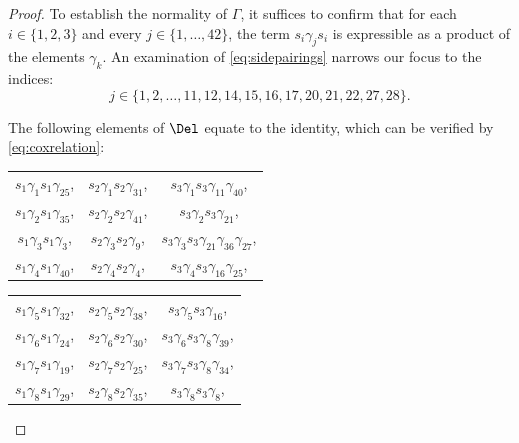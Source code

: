 \begin{proof}
To establish the normality of \(\Gamma\), it suffices to confirm that for each \(i \in \{1,2,3\}\) and every \(j \in \{1,\dots,42\}\), the term \(s_i\gamma_{j} s_i\) is expressible as a product of the elements \(\gamma_k\).
An examination of \eqref{eq:sidepairings} narrows our focus to the indices:
\[
j \in \{1, 2, \dots, 11, 12, 14, 15, 16, 17, 20, 21, 22, 27, 28\}.
\]

The following elements of $\Del$ equate to the identity, which can be verified by \eqref{eq:coxrelation}:
\begin{center}
\begin{tabular}{ccc}
$s_1\gamma_{1}s_1\gamma_{25}$,  &$s_2\gamma_{1}s_2\gamma_{31}$,  &$s_3\gamma_{1}s_3\gamma_{11}\gamma_{40}$, \\
$s_1\gamma_{2}s_1\gamma_{35}$,  &$s_2\gamma_{2}s_2\gamma_{41}$,  &$s_3\gamma_{2}s_3\gamma_{21}$, \\
$s_1\gamma_{3}s_1\gamma_{3}$,  &$s_2\gamma_{3}s_2\gamma_{9}$,  &$s_3\gamma_{3}s_3\gamma_{21}\gamma_{36}\gamma_{27}$, \\
$s_1\gamma_{4}s_1\gamma_{40}$,  &$s_2\gamma_{4}s_2\gamma_{4}$,  &$s_3\gamma_{4}s_3\gamma_{16}\gamma_{25}$, \\
\end{tabular}
\end{center}
\begin{center}
\begin{tabular}{ccc}
$s_1\gamma_{5}s_1\gamma_{32}$,  &$s_2\gamma_{5}s_2\gamma_{38}$,  &$s_3\gamma_{5}s_3\gamma_{16}$, \\
$s_1\gamma_{6}s_1\gamma_{24}$,  &$s_2\gamma_{6}s_2\gamma_{30}$,  &$s_3\gamma_{6}s_3\gamma_{8}\gamma_{39}$, \\
$s_1\gamma_{7}s_1\gamma_{19}$,  &$s_2\gamma_{7}s_2\gamma_{25}$,  &$s_3\gamma_{7}s_3\gamma_{8}\gamma_{34}$, \\
$s_1\gamma_{8}s_1\gamma_{29}$,  &$s_2\gamma_{8}s_2\gamma_{35}$,  &$s_3\gamma_{8}s_3\gamma_{8}$, \\
\end{tabular}
\end{center}


\end{proof}
